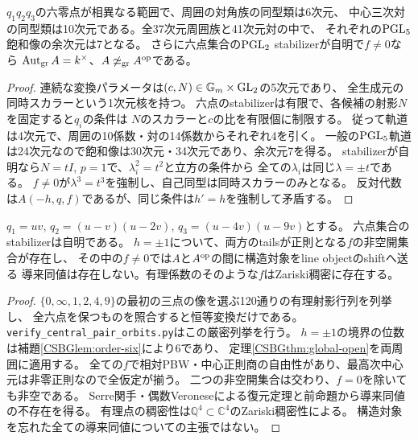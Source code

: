 \begin{proposition}[軌道次元と自己同型]
$q_1q_2q_3$の六零点が相異なる範囲で、周囲の対角族の同型類は6次元、
中心三次対の同型類は10次元である。全37次元周囲族と41次元対の中で、
それぞれの$\mathrm{PGL}_5$飽和像の余次元は7となる。
さらに六点集合の$\mathrm{PGL}_2$ stabilizerが自明で$f\ne0$なら
$\operatorname{Aut}_{\operatorname{gr}}A=k^\times$、$A\not\simeq_{\operatorname{gr}} A^{\rm op}$である。
\end{proposition}
\begin{proof}
連続な変換パラメータは$(c,N)\in\mathbb G_m\times\mathrm{GL}_2$の5次元であり、
全生成元の同時スカラーという1次元核を持つ。
六点のstabilizerは有限で、各候補の射影$N$を固定すると$q_i$の条件は
$N$のスカラーと$c$の比を有限個に制限する。
従って軌道は4次元で、周囲の10係数・対の14係数からそれぞれ4を引く。
一般の$\mathrm{PGL}_5$軌道は24次元なので飽和像は30次元・34次元であり、余次元7を得る。
stabilizerが自明なら$N=tI$, $p=1$で、$\lambda_i^2=t^2$と立方の条件から
全ての$\lambda_i$は同じ$\lambda=\pm t$である。
$f\ne0$が$\lambda^3=t^3$を強制し、自己同型は同時スカラーのみとなる。
反対代数は$A(-h,q,f)$であるが、同じ条件は$h'=h$を強制して矛盾する。
\end{proof}
\begin{corollary}[有理係数の非自己反対例と標識付き導来圏]
\label{cor:pair-not-opposite}
$q_1=uv$, $q_2=(u-v)(u-2v)$, $q_3=(u-4v)(u-9v)$とする。
六点集合のstabilizerは自明である。
$h=\pm1$について、両方のtailsが正則となる$f$の非空開集合が存在し、
その中の$f\ne0$では$A$と$A^{\rm op}$の間に構造対象をline objectのshiftへ送る
導来同値は存在しない。有理係数のそのような$f$はZariski稠密に存在する。
\end{corollary}
\begin{proof}
$\{0,\infty,1,2,4,9\}$の最初の三点の像を選ぶ120通りの有理射影行列を列挙し、
全六点を保つものを照合すると恒等変換だけである。
\texttt{verify\_central\_pair\_orbits.py}はこの厳密列挙を行う。
$h=\pm1$の境界の位数は補題\ref{CSBGlem:order-six}により6であり、
定理\ref{CSBGthm:global-open}を両周囲に適用する。
全ての$f$で相対PBW・中心正則商の自由性があり、最高次中心元は非零正則なので全仮定が揃う。
二つの非空開集合は交わり、$f=0$を除いても非空である。
Serre関手・偶数Veroneseによる復元定理と前命題から導来同値の不存在を得る。
有理点の稠密性は$\mathbb Q^4\subset\mathbb C^4$のZariski稠密性による。
構造対象を忘れた全ての導来同値についての主張ではない。
\end{proof}
